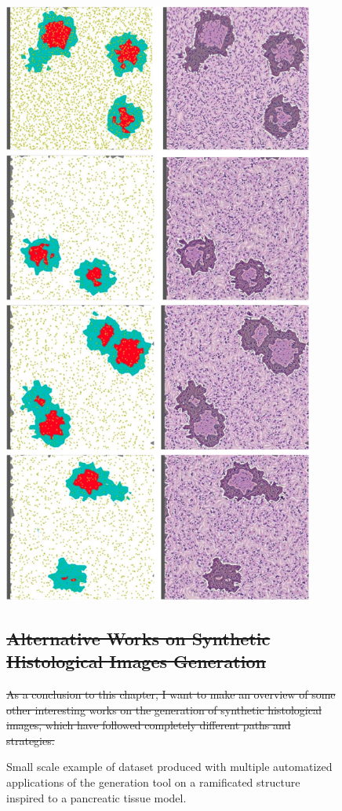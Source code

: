\documentclass[12pt,a4paper]{report}
\providecommand{\DIFdeltex}[1]{{\protect\color{red}\sout{#1}}}                      %
\providecommand{\DIFdelbeginFL}{} %
\providecommand{\DIFdel}[1]{\texorpdfstring{\DIFdeltex{#1}}{}} %
\newcommand{\DIFscaledelfig}{0.5}
\newlength{\DIFdelgraphicswidth} %
\newlength{\DIFdelgraphicsheight} %
\newcommand{\DIFdelincludegraphics}[2][]{%
\sbox{\DIFdelgraphicsbox}{\DIFOincludegraphics[#1]{#2}}%
\settoboxwidth{\DIFdelgraphicswidth}{\DIFdelgraphicsbox} %
\settoboxtotalheight{\DIFdelgraphicsheight}{\DIFdelgraphicsbox} %
\scalebox{\DIFscaledelfig}{%
\parbox[b]{\DIFdelgraphicswidth}{\usebox{\DIFdelgraphicsbox}\\[-\baselineskip] \rule{\DIFdelgraphicswidth}{0em}}\llap{\resizebox{\DIFdelgraphicswidth}{\DIFdelgraphicsheight}{%
\setlength{\unitlength}{\DIFdelgraphicswidth}%
\begin{picture}(1,1)%
\thicklines\linethickness{2pt} %
{\color[rgb]{1,0,0}\put(0,0){\framebox(1,1){}}}%
{\color[rgb]{1,0,0}\put(0,0){\line( 1,1){1}}}%
{\color[rgb]{1,0,0}\put(0,1){\line(1,-1){1}}}%
\end{picture}%
}\hspace*{3pt}}} %
} %
\DeclareRobustCommand{\DIFdelbeginFL}{\DIFOdelbeginFL \let\includegraphics\DIFdelincludegraphics} %
\begin{document}
    \begin{figure}
        \centering
        \includegraphics[height=20cm,keepaspectratio]{images/dataset}
        \caption{Small scale example of dataset produced with multiple automatized applications of the generation tool on a ramificated structure inspired to a pancreatic tissue model.}
        \label{fig:dataset}
    \DIFdelbeginFL %

\subsection{\DIFdel{Alternative Works on Synthetic Histological Images Generation}}
\addtocounter{subsection}{-1}%
\DIFdel{As a conclusion to this chapter, I want to make an overview of some other interesting works on the generation of synthetic histological images, which have followed completely different paths and strategies.
}%


\end{figure}
\end{document}
